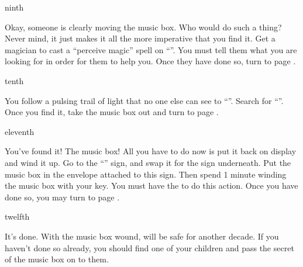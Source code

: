 \documentclass[greennotebook]{NeptuneBall}
\begin{document}
\begin{page}{ninth}

Okay, someone is clearly moving the music box. Who would do such a thing? Never mind, it just makes it all the more imperative that you find it. Get a magician to cast a ``perceive magic'' spell on ``\sPacketC{}''. You must tell them what you are looking for in order for them to help you. Once they have done so, turn to page .

\end{page}

\begin{page}{tenth}

You follow a pulsing trail of light that no one else can see to ``\sDungeons{}''. Search for ``\sPacketD{}''. Once you find it, take the music box out and turn to page .

\end{page}

\begin{page}{eleventh}

You've found it! The music box! All you have to do now is put it back on display and wind it up. Go to the ``\sArtifactZero{}'' sign, and swap it for the sign underneath. Put the music box in the envelope attached to this sign. Then spend 1 minute winding the music box with your key. You must have the \iMusicBoxKey{} to do this action. Once you have done so, you may turn to page .

\end{page}

\begin{page}{twelfth}

It's done. With the music box wound, \pAtlantis{} will be safe for another decade. If you haven't done so already, you should find one of your children and pass the secret of the music box on to them.

\end{page}

\endnotebook
\end{document}
